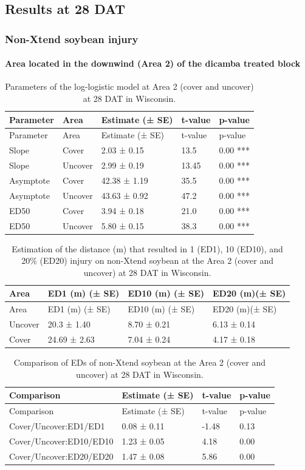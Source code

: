 \documentclass[]{article}
\let\oldparagraph\paragraph
\renewcommand{\paragraph}[1]{\oldparagraph{#1}\mbox{}}
\begin{document}
\pagebreak
\newpage

\subsection{Results at 28 DAT}\label{results-at-28-dat}

\subsubsection{Non-Xtend soybean
injury}\label{non-xtend-soybean-injury-6}

\paragraph{Area located in the downwind (Area 2) of the dicamba treated
block}\label{area-located-in-the-downwind-area-2-of-the-dicamba-treated-block}

\begin{longtable}[]{@{}lllll@{}}
\caption{Parameters of the log-logistic model at Area 2 (cover and
uncover) at 28 DAT in Wisconsin.}\tabularnewline
\toprule
Parameter & Area & Estimate (± SE) & t-value & p-value\tabularnewline
\midrule
\endfirsthead
\toprule
Parameter & Area & Estimate (± SE) & t-value & p-value\tabularnewline
\midrule
\endhead
Slope & Cover & 2.03 ± 0.15 & 13.5 & 0.00 ***\tabularnewline
Slope & Uncover & 2.99 ± 0.19 & 13.45 & 0.00 ***\tabularnewline
Asymptote & Cover & 42.38 ± 1.19 & 35.5 & 0.00 ***\tabularnewline
Asymptote & Uncover & 43.63 ± 0.92 & 47.2 & 0.00 ***\tabularnewline
ED50 & Cover & 3.94 ± 0.18 & 21.0 & 0.00 ***\tabularnewline
ED50 & Uncover & 5.80 ± 0.15 & 38.3 & 0.00 ***\tabularnewline
\bottomrule
\end{longtable}

\begin{longtable}[]{@{}llll@{}}
\caption{Estimation of the distance (m) that resulted in 1 (ED1), 10
(ED10), and 20\% (ED20) injury on non-Xtend soybean at the Area 2 (cover
and uncover) at 28 DAT in Wisconsin.}\tabularnewline
\toprule
Area & ED1 (m) (± SE) & ED10 (m) (± SE) & ED20 (m)(± SE)\tabularnewline
\midrule
\endfirsthead
\toprule
Area & ED1 (m) (± SE) & ED10 (m) (± SE) & ED20 (m)(± SE)\tabularnewline
\midrule
\endhead
Uncover & 20.3 ± 1.40 & 8.70 ± 0.21 & 6.13 ± 0.14\tabularnewline
Cover & 24.69 ± 2.63 & 7.04 ± 0.24 & 4.17 ± 0.18\tabularnewline
\bottomrule
\end{longtable}

\begin{longtable}[]{@{}llll@{}}
\caption{Comparison of EDs of non-Xtend soybean at the Area 2 (cover and
uncover) at 28 DAT in Wisconsin.}\tabularnewline
\toprule
Comparison & Estimate (± SE) & t-value & p-value\tabularnewline
\midrule
\endfirsthead
\toprule
Comparison & Estimate (± SE) & t-value & p-value\tabularnewline
\midrule
\endhead
Cover/Uncover:ED1/ED1 & 0.08 ± 0.11 & -1.48 & 0.13\tabularnewline
Cover/Uncover:ED10/ED10 & 1.23 ± 0.05 & 4.18 & 0.00\tabularnewline
Cover/Uncover:ED20/ED20 & 1.47 ± 0.08 & 5.86 & 0.00\tabularnewline
\bottomrule
\end{longtable}
\end{document}
